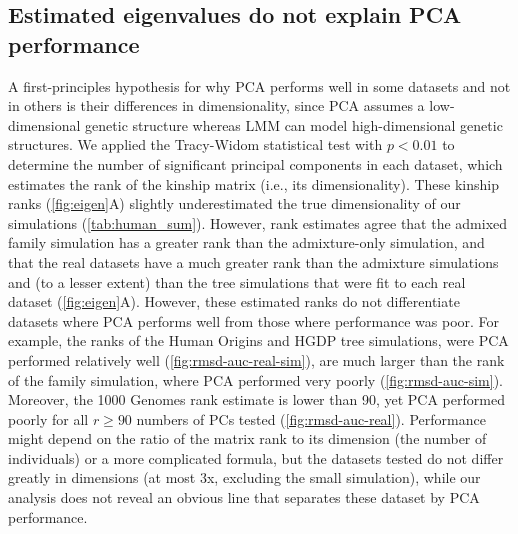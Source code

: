 \documentclass[11pt]{article}
\begin{document}
\subsection{Estimated eigenvalues do not explain PCA performance}

A first-principles hypothesis for why PCA performs well in some datasets and not in others is their differences in dimensionality, since PCA assumes a low-dimensional genetic structure whereas LMM can model high-dimensional genetic structures.
We applied the Tracy-Widom statistical test \citep{patterson_population_2006} with $p < 0.01$ to determine the number of significant principal components in each dataset, which estimates the rank of the kinship matrix (i.e., its dimensionality).
These kinship ranks (\cref{fig:eigen}A) slightly underestimated the true dimensionality of our simulations (\cref{tab:human_sum}).
However, rank estimates agree that the admixed family simulation has a greater rank than the admixture-only simulation, and that the real datasets have a much greater rank than the admixture simulations and (to a lesser extent) than the tree simulations that were fit to each real dataset (\cref{fig:eigen}A).
However, these estimated ranks do not differentiate datasets where PCA performs well from those where performance was poor.
For example, the ranks of the Human Origins and HGDP tree simulations, were PCA performed relatively well (\cref{fig:rmsd-auc-real-sim}), are much larger than the rank of the family simulation, where PCA performed very poorly (\cref{fig:rmsd-auc-sim}).
Moreover, the 1000 Genomes rank estimate is lower than 90, yet PCA performed poorly for all $r \ge 90$ numbers of PCs tested (\cref{fig:rmsd-auc-real}).
Performance might depend on the ratio of the matrix rank to its dimension (the number of individuals) or a more complicated formula, but the datasets tested do not differ greatly in dimensions (at most 3x, excluding the small simulation), while our analysis does not reveal an obvious line that separates these dataset by PCA performance.
\end{document}
